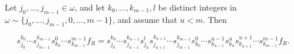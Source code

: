 Let $j_0, \ldots, j_{m-1} \in \omega$, and let $k_0, \ldots, k_{m-1}, l$ be distinct integers in $\omega \sim \{j_0, \ldots, j_{m-1}, 0, \ldots, m-1\}$, and assume that $u < m$. Then

$$s_{j_0}^{k_0} \cdots s_{j_{m-1}}^{k_{m-1}} s_{k_0}^{0} \cdots s_{k_{m-1}}^{m-1} f_R = s_{j_0}^{k_0} \cdots s_{j_{u-1}}^{k_{u-1}} s_{j_u}^{l} s_{j_{u+1}}^{k_{u+1}} \cdots s_{j_{m-1}}^{k_{m-1}} s_{k_0}^{0} \cdots s_{k_{u-1}}^{u-1} s_{k_u}^{u} s_{k_{u+1}}^{u+1} \cdots s_{k_{m-1}}^{m-1} f_R.$$
